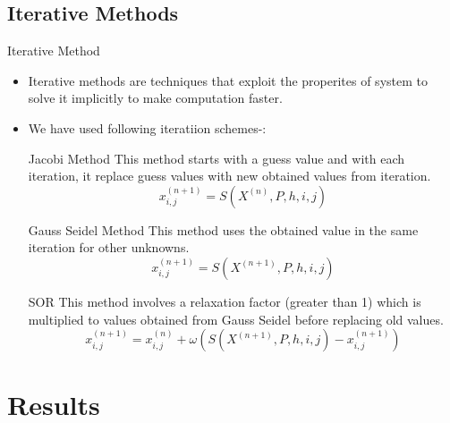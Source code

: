 \documentclass{beamer}
\begin{document}
		\subsection{Iterative Methods}
		\begin{frame}[allowframebreaks]{Iterative Method}
			\begin{itemize}

				\item Iterative methods are techniques that exploit the properites of system to solve it implicitly to make computation faster.
				\item We have used following iteratiion schemes-:\\
			
					 \begin{block}{Jacobi Method}
						This method starts with a guess value and with each iteration, it replace guess values with new obtained values from iteration.$$ x^{(n+1)}_{i,j} = S(X^{(n)},P,h,i,j) $$
						\end{block}
					 \begin{block}{Gauss Seidel Method}
						This method uses the obtained value in the same iteration for other unknowns.$$x^{(n+1)}_{i,j} = S(X^{(n+1)},P,h,i,j)$$
						\end{block}
					
					\begin{block}{SOR}
							This method involves a relaxation factor (greater than 1) which is multiplied to values obtained from Gauss Seidel before replacing old values.$$x^{(n+1)}_{i,j} = x^{(n)}_{i,j}+ \omega(S(X^{(n+1)},P,h,i,j)- x^{(n+1)}_{i,j})$$
							
						\end{block}
				
					
					\end{itemize}
				\end{frame}
			\section{Results}
\end{document}
